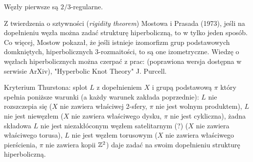 \begin{conjecture}
    Węzły pierwsze są $2/3$-regularne.
\end{conjecture}



Z twierdzenia o sztywności (\emph{rigidity theorem}) Mostowa i Prasada (1973), jeśli na dopełnieniu węzła można zadać strukturę hiperboliczną, to w tylko jeden sposób.
Co więcej, Mostow pokazał, że jeśli istnieje izomorfizm grup podstawowych domkniętych, hiperbolicznych 3-rozmaitości, to są one izometryczne.
Wiedzę o węzłach hiperbolicznych można czerpać z prac: \cite{weeks05} (poprawiona wersja dostępna w serwisie ArXiv), "Hyperbolic Knot Theory" J. Purcell.

Kryterium Thurstona: splot $L$ z dopełnieniem $X$ i grupą podstawową $\pi$ który spełnia poniższe warunki (a każdy warunek zakłada poprzednie): $L$ nie rozszczepia się ($X$ nie zawiera właściwej 2-sfery, $\pi$ nie jest wolnym produktem), $L$ nie jest niewęzłem ($X$ nie zawiera właściwego dysku, $\pi$ nie jest cykliczna), żadna składowa $L$ nie jest niezakłóconym węzłem satelitarnym (?) ($X$ nie zawiera właściwego torusa), $L$ nie jest węzłem torusowym ($X$ nie zawiera właściwego pierścienia, $\pi$ nie zawiera kopii $\mathbb Z^2$) daje zadać na swoim dopełnieniu strukturę hiperboliczną.
